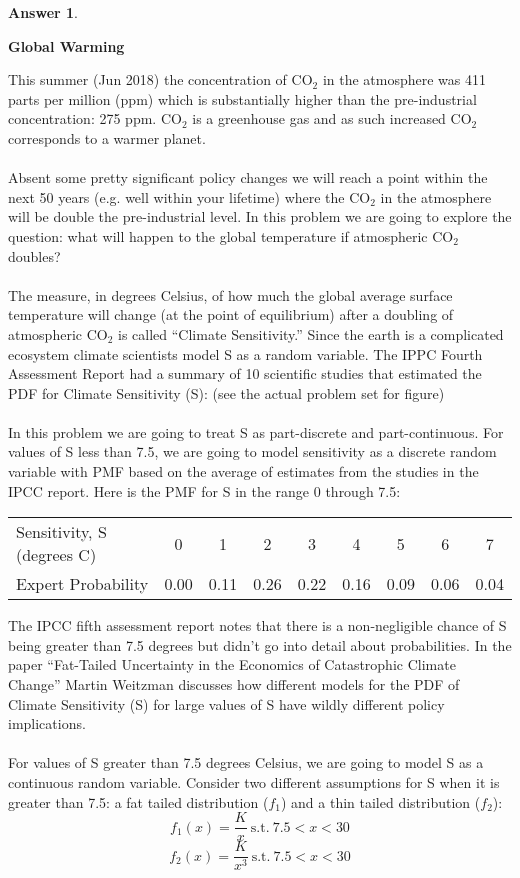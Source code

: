 \documentclass[12pt]{article}
\renewcommand{\(}{\left(}
\renewcommand{\)}{\right)}
\theoremstyle{definition}
\newtheorem*{answer}{Answer}
\begin{document}
\begin{enumerate}
{\begin{shaded}
\begin{answer}
    \end{answer}
    \end{shaded}
    \pagebreak
    \textbf{Global Warming}
    \item This summer (Jun 2018) the concentration of CO$_2$ in the atmosphere was 411 parts per million (ppm) which is substantially higher than the pre-industrial concentration: 275 ppm. CO$_2$ is a greenhouse gas and as such increased CO$_2$ corresponds to a warmer planet.\\ \\
    Absent some pretty significant policy changes we will reach a point within the next 50 years (e.g. well within your lifetime) where the CO$_2$ in the atmosphere will be double the pre-industrial level. In this problem we are going to explore the question: what will happen to the global temperature if atmospheric CO$_2$ doubles?\\ \\
    The measure, in degrees Celsius, of how much the global average surface temperature will change (at the point of equilibrium) after a doubling of atmospheric CO$_2$ is called ``Climate Sensitivity.'' Since the earth is a complicated ecosystem climate scientists model S as a random variable. The IPPC Fourth Assessment Report had a summary of 10 scientific studies that estimated the PDF for Climate Sensitivity (S): (see the actual problem set for figure)\\ \\
    In this problem we are going to treat S as part-discrete and part-continuous. For values of S less than 7.5, we are going to model sensitivity as a discrete random variable with PMF based on the average of estimates from the studies in the IPCC report. Here is the PMF for S in the range 0 through 7.5:
    \begin{center}
        \begin{tabular}{lcccccccc}
        Sensitivity, S (degrees C)
         & 0 & 1 & 2 & 3 & 4 & 5 & 6 & 7\\
        Expert Probability
         & 0.00 & 0.11 & 0.26 & 0.22 & 0.16 & 0.09 & 0.06 & 0.04\\
        \end{tabular}
    \end{center}
    The IPCC fifth assessment report notes that there is a non-negligible chance of S being greater than 7.5 degrees but didn't go into detail about probabilities. In the paper ``Fat-Tailed Uncertainty in the Economics of Catastrophic Climate Change'' Martin Weitzman discusses how different models for the PDF of Climate Sensitivity (S) for large values of S have wildly different policy implications.\\ \\
    For values of S greater than 7.5 degrees Celsius, we are going to model S as a continuous random variable. Consider two different assumptions for S when it is greater than 7.5: a fat tailed distribution ($f_1$) and a thin tailed distribution ($f_2$):
    \[
        f_1(x) = \frac{K}{x}\ \text{s.t.}\ 7.5 < x < 30
    \]
    \[
        f_2(x) = \frac{K}{x^3}\ \text{s.t.}\ 7.5 < x< 30
    \]
    
}
\end{enumerate}
\end{document}
